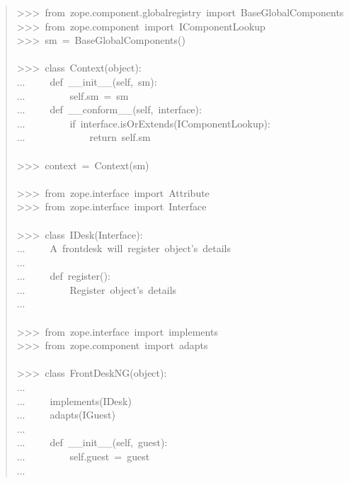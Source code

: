 \documentclass[14pt,a4paper,openany,twoside,final]{extbook}
\begin{document}
\begin{quote}{\ttfamily \raggedright \noindent
>{}>{}>~from~zope.component.globalregistry~import~BaseGlobalComponents\\
>{}>{}>~from~zope.component~import~IComponentLookup\\
>{}>{}>~sm~=~BaseGlobalComponents()\\
~\\
>{}>{}>~class~Context(object):\\
...~~~~~def~\_\_init\_\_(self,~sm):\\
...~~~~~~~~~self.sm~=~sm\\
...~~~~~def~\_\_conform\_\_(self,~interface):\\
...~~~~~~~~~if~interface.isOrExtends(IComponentLookup):\\
...~~~~~~~~~~~~~return~self.sm\\
~\\
>{}>{}>~context~=~Context(sm)\\
~\\
>{}>{}>~from~zope.interface~import~Attribute\\
>{}>{}>~from~zope.interface~import~Interface\\
~\\
>{}>{}>~class~IDesk(Interface):\\
...~~~~~\textquotedbl{}\textquotedbl{}\textquotedbl{}A~frontdesk~will~register~object's~details\textquotedbl{}\textquotedbl{}\textquotedbl{}\\
...\\
...~~~~~def~register():\\
...~~~~~~~~~\textquotedbl{}\textquotedbl{}\textquotedbl{}Register~object's~details\textquotedbl{}\textquotedbl{}\textquotedbl{}\\
...\\
~\\
>{}>{}>~from~zope.interface~import~implements\\
>{}>{}>~from~zope.component~import~adapts\\
~\\
>{}>{}>~class~FrontDeskNG(object):\\
...\\
...~~~~~implements(IDesk)\\
...~~~~~adapts(IGuest)\\
...\\
...~~~~~def~\_\_init\_\_(self,~guest):\\
...~~~~~~~~~self.guest~=~guest\\
...\\
}
\end{quote}
\end{document}
